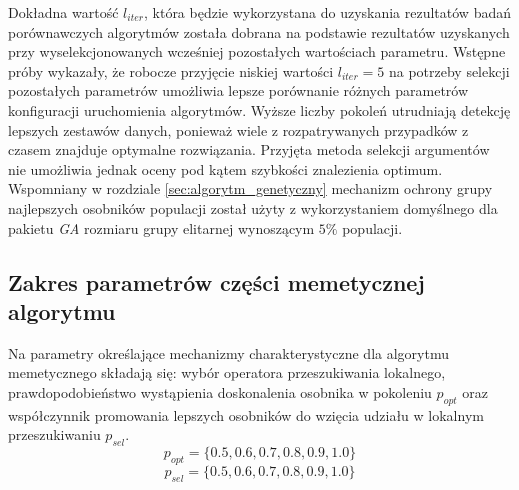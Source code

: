 \par
Dokładna wartość $l_{iter}$, która będzie wykorzystana do uzyskania rezultatów badań porównawczych algorytmów została dobrana na podstawie rezultatów uzyskanych przy wyselekcjonowanych wcześniej pozostałych wartościach parametru. Wstępne próby wykazały, że robocze przyjęcie niskiej wartości $l_{iter}=5$ na potrzeby selekcji pozostałych parametrów umożliwia lepsze porównanie różnych parametrów konfiguracji uruchomienia algorytmów. Wyższe liczby pokoleń utrudniają detekcję lepszych zestawów danych, ponieważ wiele z rozpatrywanych przypadków z czasem znajduje optymalne rozwiązania. Przyjęta metoda selekcji argumentów nie umożliwia jednak oceny pod kątem szybkości znalezienia optimum. Wspomniany w rozdziale \ref{sec:algorytm_genetyczny} mechanizm ochrony grupy najlepszych osobników populacji został użyty z wykorzystaniem domyślnego dla pakietu \emph{GA} rozmiaru grupy elitarnej wynoszącym $5\%$ populacji.





\subsection{Zakres parametrów części memetycznej algorytmu}
Na parametry określające mechanizmy charakterystyczne dla algorytmu memetycznego składają się: wybór operatora przeszukiwania lokalnego, prawdopodobieństwo wystąpienia doskonalenia osobnika w pokoleniu $p_{opt}$ oraz współczynnik promowania lepszych osobników do wzięcia udziału w lokalnym przeszukiwaniu $p_{sel}$. 
\[p_{opt} = \lbrace0.5, 0.6, 0.7, 0.8, 0.9, 1.0\rbrace\]
\[p_{sel} = \lbrace0.5, 0.6, 0.7, 0.8, 0.9, 1.0\rbrace\]


